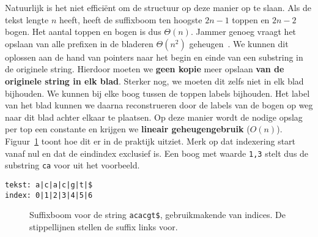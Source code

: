 Natuurlijk is het niet efficiënt om de structuur op deze manier op te slaan.
Als de tekst lengte $n$ heeft, heeft de suffixboom ten hoogste $2n - 1$ toppen en $2n - 2$ bogen.
Het aantal toppen en bogen is dus $\Theta(n)$.
Jammer genoeg vraagt het opslaan van alle prefixen in de bladeren $\Theta(n^2)$ geheugen~\cite{AD3_ukkonen}.
We kunnen dit oplossen aan de hand van pointers naar het begin en einde van een substring in de originele string.
Hierdoor moeten we \textbf{geen kopie} meer opslaan\textbf{ van de originele string in elk blad}.
Sterker nog, we moeten dit zelfs niet in elk blad bijhouden.
We kunnen bij elke boog tussen de toppen labels bijhouden.
Het label van het blad kunnen we daarna reconstrueren door de labels van de bogen op weg naar dit blad achter elkaar te plaatsen.
Op deze manier wordt de nodige opslag per top een constante en krijgen we \textbf{lineair geheugengebruik} ($O(n)$).
Figuur~\ref{fig:suffix_tree_example_indices} toont hoe dit er in de praktijk uitziet.
Merk op dat indexering start vanaf nul en dat de eindindex exclusief is.
Een boog met waarde \texttt{1,3} stelt dus de substring \texttt{ca} voor uit het voorbeeld.
\begin{center}
    \texttt{tekst: a|c|a|c|g|t|\$\\index: 0|1|2|3|4|5|6}
\end{center}

\begin{figure}[H]
    \center
    \caption{Suffixboom voor de string \texttt{acacgt\$}, gebruikmakende van indices. De stippellijnen stellen de suffix links voor.}\label{fig:suffix_tree_example_indices}

\end{figure}

